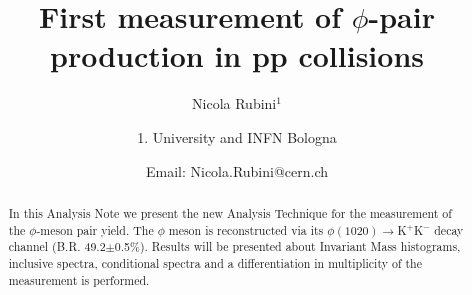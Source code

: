 \documentclass[ALICE,manyauthors]{ALICE_analysis_notes}
\begin{document}
%
%
%
\begin{titlepage}
%
\PHdate{\today}
%
\title{First measurement of $\phi$-pair production in pp collisions}
%
\author{Nicola Rubini$^{1}$}
\author{
1. University and INFN Bologna\\
}
\author{Email: Nicola.Rubini@cern.ch}
%
%
\begin{abstract}
In this Analysis Note we present the new Analysis Technique for the measurement of the $\phi$-meson pair yield. The $\phi$ meson is reconstructed via its $\phi(1020)\to$K$^{+}$K$^{-}$ decay channel (B.R. 49.2$\pm$0.5\%). Results will be presented about Invariant Mass histograms, inclusive spectra, conditional spectra and a differentiation in multiplicity of the measurement is performed.
\end{abstract}
\end{titlepage}
%
\tableofcontents
\newpage
%
%
\setcounter{secnumdepth}{0}

\setcounter{secnumdepth}{1}
\newpage








\setcounter{secnumdepth}{0}
%
\setcounter{secnumdepth}{1}
%
\printbibliography
%
\end{document}
